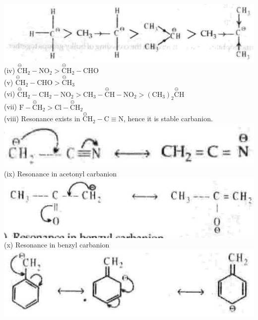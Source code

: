 \documentclass[10pt]{article}
\begin{document}
\includegraphics[max width=\textwidth, center]{2025_01_28_8470952b98110cec3aabg-088(2)}\\
(iv) $\stackrel{\ominus}{\mathrm{C}} \mathrm{H}_{2}-\mathrm{NO}_{2}>\stackrel{\ominus}{\mathrm{C}} \mathrm{H}_{2}-\mathrm{CHO}$\\
(v) $\stackrel{\ominus}{\mathrm{C}} \mathrm{H}_{2}-\mathrm{CHO}>\stackrel{\ominus}{\mathrm{C}} \mathrm{H}_{3}$\\
(vi) $\stackrel{\ominus}{\mathrm{C}} \mathrm{H}_{2}-\mathrm{CH}_{2}-\mathrm{NO}_{2}>\mathrm{CH}_{3}-\stackrel{\ominus}{\mathrm{C}} \mathrm{H}-\mathrm{NO}_{2}>\left(\mathrm{CH}_{3}\right)_{2} \stackrel{\ominus}{\mathrm{C}} \mathrm{H}$\\
(vii) $\mathrm{F}-\stackrel{\ominus}{\mathrm{C}} \mathrm{H}_{2}>\mathrm{Cl}-\stackrel{\ominus}{\mathrm{C}} \mathrm{H}_{2}$\\
(viii) Resonance exists in $\stackrel{\ominus}{\mathrm{C}} \mathrm{H}_{2}-\mathrm{C} \equiv \mathrm{N}$, hence it is stable carbanion.\\
\includegraphics[max width=\textwidth, center]{2025_01_28_8470952b98110cec3aabg-088(3)}\\
(ix) Resonance in acetonyl carbanion\\
\includegraphics[max width=\textwidth, center]{2025_01_28_8470952b98110cec3aabg-088}\\
(x) Resonance in benzyl carbanion\\
\includegraphics[max width=\textwidth, center]{2025_01_28_8470952b98110cec3aabg-088(1)}\\
\end{document}
